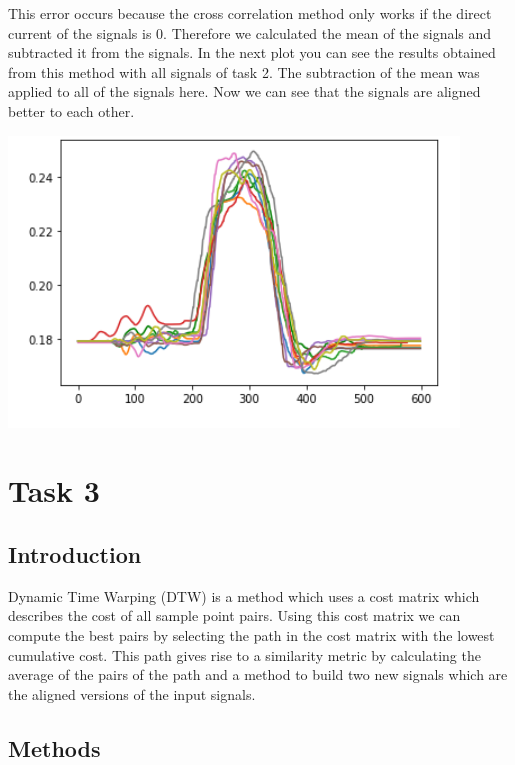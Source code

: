 \documentclass[11pt,a4paper]{article}
\begin{document}
This error occurs because the cross correlation method only works if the direct current of the signals is 0. Therefore we calculated the mean of the signals and subtracted it from the signals.
In the next plot you can see the results obtained from this method with all signals of task 2. The subtraction of the mean was applied to all of the signals here. Now we can see that the signals are aligned better to each other. \\

\begin{center}
\includegraphics{images/task2_3.PNG} \\
\end{center}



\section{Task 3}\label{section:task3}
\subsection{Introduction}
\label{sec:intro}
Dynamic Time Warping (DTW) is a method which uses a cost matrix which describes the cost of all sample point pairs. Using this cost matrix we can compute the best pairs by selecting the path in the cost matrix with the lowest cumulative cost. This path gives rise to a similarity metric by calculating the average of the pairs of the path and a method to build two new signals which are the aligned versions of the input signals.

\subsection{Methods}
\end{document}
